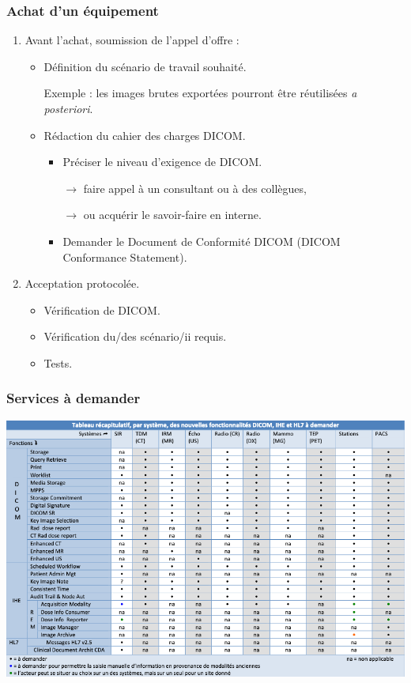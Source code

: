 \frame
{
	\frametitle{Achat d'un \'equipement}
	\begin{enumerate}
		\item Avant l'achat, soumission de l'appel d'offre :
		\begin{itemize}
			\item D\'efinition du sc\'enario de travail souhait\'e.

                Exemple : les images brutes export\'ees pourront \^etre r\'eutilis\'ees \emph{a posteriori}.
			\item R\'edaction du cahier des charges DICOM.
			\begin{itemize}
				\item Pr\'eciser le niveau d'exigence de DICOM.
				
				$\rightarrow$ faire appel \`a un consultant ou \`a des coll\`egues,
				
				$\rightarrow$ ou acqu\'erir le savoir-faire en interne.
				\item Demander le Document de Conformit\'e DICOM (DICOM Conformance Statement).
			\end{itemize}
		\end{itemize}
		\item Acceptation protocol\'ee.
		\begin{itemize}
			\item V\'erification de DICOM.
			\item V\'erification du/des sc\'enario/ii requis.
			\item Tests.
		\end{itemize}
	\end{enumerate}
}

\frame
{
	\frametitle{Services \`a demander}
	\begin{center}
		\includegraphics[width=\linewidth]{./figures/tableau-services.png}
	\end{center}
}

